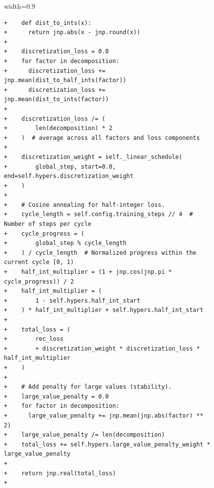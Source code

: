 \documentclass[logo,copyright,12pt]{googledeepmind}
\theoremstyle{definition}
\theoremstyle{remark}
\theoremstyle{plain}
\begin{document}
\begin{figure}[p]
\renewcommand{\thefigure}{\arabic{figure}c}\vspace{-0.03\textwidth}
\begin{adjustbox}{width=0.9\textwidth}
\begin{minipage}{0.9\textwidth}
\begin{lstlisting}[style=pydiff, backgroundcolor=\color{backcolour}, firstnumber=131]
+    def dist_to_ints(x):
+      return jnp.abs(x - jnp.round(x))
+
+    discretization_loss = 0.0
+    for factor in decomposition:
+      discretization_loss += jnp.mean(dist_to_half_ints(factor))
+      discretization_loss += jnp.mean(dist_to_ints(factor))
+
+    discretization_loss /= (
+        len(decomposition) * 2
+    )  # average across all factors and loss components
+
+    discretization_weight = self._linear_schedule(
+        global_step, start=0.0, end=self.hypers.discretization_weight
+    )
+
+    # Cosine annealing for half-integer loss.
+    cycle_length = self.config.training_steps // 4  # Number of steps per cycle
+    cycle_progress = (
+        global_step % cycle_length
+    ) / cycle_length  # Normalized progress within the current cycle [0, 1)
+    half_int_multiplier = (1 + jnp.cos(jnp.pi * cycle_progress)) / 2
+    half_int_multiplier = (
+        1 - self.hypers.half_int_start
+    ) * half_int_multiplier + self.hypers.half_int_start
+
+    total_loss = (
+        rec_loss
+        + discretization_weight * discretization_loss * half_int_multiplier
+    )
+
+    # Add penalty for large values (stability).
+    large_value_penalty = 0.0
+    for factor in decomposition:
+      large_value_penalty += jnp.mean(jnp.abs(factor) ** 2)
+    large_value_penalty /= len(decomposition)
+    total_loss += self.hypers.large_value_penalty_weight * large_value_penalty
+
+    return jnp.real(total_loss)
+
 

\end{lstlisting}
\end{minipage}
\end{adjustbox}
\end{figure}
\end{document}

